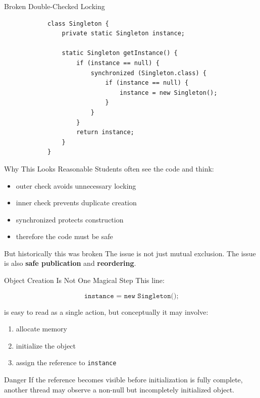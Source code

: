 \documentclass[aspectratio=169,11pt]{beamer}
\begin{document}
	\begin{frame}[fragile]{Broken Double-Checked Locking}
		\begin{lstlisting}
			class Singleton {
				private static Singleton instance;
				
				static Singleton getInstance() {
					if (instance == null) {
						synchronized (Singleton.class) {
							if (instance == null) {
								instance = new Singleton();
							}
						}
					}
					return instance;
				}
			}
		\end{lstlisting}
	\end{frame}
	
	\begin{frame}{Why This Looks Reasonable}
		Students often see the code and think:
		
		\begin{itemize}
			\item outer check avoids unnecessary locking
			\item inner check prevents duplicate creation
			\item synchronized protects construction
			\item therefore the code must be safe
		\end{itemize}
		
		\vspace{0.3cm}
		
		\begin{alertblock}{But historically this was broken}
			The issue is not just mutual exclusion.  
			The issue is also \textbf{safe publication} and \textbf{reordering}.
		\end{alertblock}
	\end{frame}
	
	\begin{frame}{Object Creation Is Not One Magical Step}
		This line:
		
		\[
		\texttt{instance = new Singleton();}
		\]
		
		is easy to read as a single action, but conceptually it may involve:
		
		\begin{enumerate}
			\item allocate memory
			\item initialize the object
			\item assign the reference to \texttt{instance}
		\end{enumerate}
		
		\vspace{0.35cm}
		
		\begin{alertblock}{Danger}
			If the reference becomes visible before initialization is fully complete, another thread may observe a non-null but incompletely initialized object.
		\end{alertblock}
	\end{frame}
	
\end{document}
